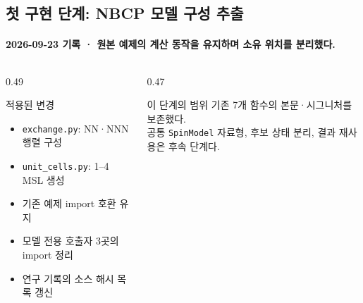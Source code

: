 \subsection{첫 구현 단계: NBCP 모델 구성 추출}\label{implemented}
\begingroup%
  \framesubtitle{2026-09-23 기록 · 원본 예제의 계산 동작을 유지하며 소유 위치를 분리했다.}
  \begin{columns}[T,onlytextwidth]
    \begin{column}{0.49\textwidth}
      \begin{block}{적용된 변경}
        \begin{itemize}
          \item \texttt{exchange.py}: NN·NNN 행렬 구성
          \item \texttt{unit\_cells.py}: 1--4 MSL 생성
          \item 기존 예제 import 호환 유지
          \item 모델 전용 호출자 3곳의 import 정리
          \item 연구 기록의 소스 해시 목록 갱신
        \end{itemize}
      \end{block}
    \end{column}
    \begin{column}{0.47\textwidth}
      \begin{block}{이 단계의 범위}
        기존 7개 함수의 본문·시그니처를 보존했다.\\[0.8em]
        공통 \texttt{SpinModel} 자료형, 후보 상태 분리,
        결과 재사용은 후속 단계다.
      \end{block}
      \smallskip
    \end{column}
  \end{columns}
\endgroup


